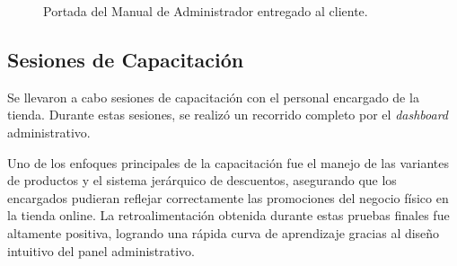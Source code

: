 \begin{figure}[H]
    \centering
    \caption{Portada del Manual de Administrador entregado al cliente.}
    \label{fig:manual_portada}
\end{figure}

\subsection{Sesiones de Capacitación}

Se llevaron a cabo sesiones de capacitación con el personal encargado de la tienda. Durante estas sesiones, se realizó un recorrido completo por el \textit{dashboard} administrativo. 

Uno de los enfoques principales de la capacitación fue el manejo de las variantes de productos y el sistema jerárquico de descuentos, asegurando que los encargados pudieran reflejar correctamente las promociones del negocio físico en la tienda online. La retroalimentación obtenida durante estas pruebas finales fue altamente positiva, logrando una rápida curva de aprendizaje gracias al diseño intuitivo del panel administrativo.
